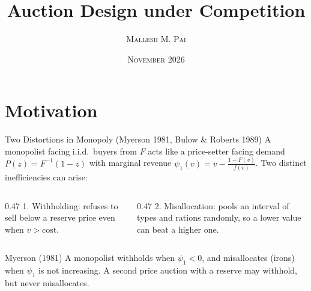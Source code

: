 \documentclass[11pt,aspectratio=169]{beamer}
\def\seg#1#2#3#4{\fill[#3,draw=InkTwo,line width=0.3pt] (#1,#4) rectangle (#2,#4+0.42);}
\begin{document}
\title[Auction Design under Competition]{Auction Design under Competition}
\author[Mallesh Pai]{\large\textsc{Mallesh M. Pai}}
\institute[Tempo]{\vspace{4mm}\inserttitlegraphic}
\date{\textsc{November 2026}}

\begin{frame}
\maketitle
\end{frame}

\section{Motivation}

\begin{frame}{Two Distortions in Monopoly (Myerson 1981, Bulow \& Roberts 1989)}
A monopolist facing i.i.d.\ buyers from $F$ acts like a price-setter facing demand $P(z)=F^{-1}(1-z)$ with marginal revenue $\psi_1(v)=v-\frac{1-F(v)}{f(v)}$. Two distinct inefficiencies can arise:

\medskip
\begin{columns}[T]
\begin{column}{0.47\textwidth}
1. \alert{Withholding}: refuses to sell below a reserve price even when $v > \text{cost}$.

\bigskip
\centering
{}
\end{column}
\begin{column}{0.47\textwidth}
2. \alert{Misallocation}: \alert{pools} an interval of types and rations randomly, so a lower value can beat a higher one.

\bigskip
\centering
{}
\end{column}
\end{columns}

\bigskip{}
\begin{block}{Myerson (1981)}
A monopolist withholds when $\psi_1 < 0$, and misallocates (irons) when $\psi_1$ is not increasing. A second price auction with a reserve may withhold, but never misallocates.
\end{block}
\end{frame}
\end{document}
